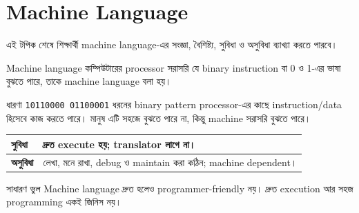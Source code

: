 \section{Machine Language}

\begin{learningbox}
এই টপিক শেষে শিক্ষার্থী machine language-এর সংজ্ঞা, বৈশিষ্ট্য, সুবিধা ও অসুবিধা ব্যাখ্যা করতে পারবে।
\end{learningbox}

\begin{definitionbox}{Machine language}
কম্পিউটারের processor সরাসরি যে binary instruction বা 0 ও 1-এর ভাষা বুঝতে পারে, তাকে machine language বলা হয়।
\end{definitionbox}

\begin{examplebox}{ধারণা}
\texttt{10110000 01100001} ধরনের binary pattern processor-এর কাছে instruction/data হিসেবে কাজ করতে পারে। মানুষ এটি সহজে বুঝতে পারে না, কিন্তু machine সরাসরি বুঝতে পারে।
\end{examplebox}

\begin{center}
\begin{tabular}{|p{}|p{}|}
\hline
\textbf{সুবিধা} & দ্রুত execute হয়; translator লাগে না। \\
\hline
\textbf{অসুবিধা} & লেখা, মনে রাখা, debug ও maintain করা কঠিন; machine dependent। \\
\hline
\end{tabular}
\end{center}

\begin{mistakebox}{সাধারণ ভুল}
Machine language দ্রুত হলেও programmer-friendly নয়। দ্রুত execution আর সহজ programming একই জিনিস নয়।
\end{mistakebox}
